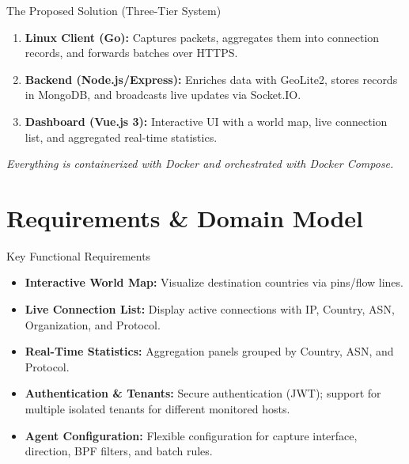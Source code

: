 \documentclass[aspectratio=169]{beamer}
\begin{document}
\begin{frame}{The Proposed Solution (Three-Tier System)}
    \begin{enumerate}
        \item \textbf{Linux Client (Go):} Captures packets, aggregates them into connection records, and forwards batches over HTTPS.
        \item \textbf{Backend (Node.js/Express):} Enriches data with GeoLite2, stores records in MongoDB, and broadcasts live updates via Socket.IO.
        \item \textbf{Dashboard (Vue.js 3):} Interactive UI with a world map, live connection list, and aggregated real-time statistics.
    \end{enumerate}
    \vspace{0.5cm}
    \textit{Everything is containerized with Docker and orchestrated with Docker Compose.}
\end{frame}

\section{Requirements \& Domain Model}

\begin{frame}{Key Functional Requirements}
    \begin{itemize}
        \item \textbf{Interactive World Map:} Visualize destination countries via pins/flow lines.
        \item \textbf{Live Connection List:} Display active connections with IP, Country, ASN, Organization, and Protocol.
        \item \textbf{Real-Time Statistics:} Aggregation panels grouped by Country, ASN, and Protocol.
        \item \textbf{Authentication \& Tenants:} Secure authentication (JWT); support for multiple isolated tenants for different monitored hosts.
        \item \textbf{Agent Configuration:} Flexible configuration for capture interface, direction, BPF filters, and batch rules.
    \end{itemize}
\end{frame}
\end{document}
